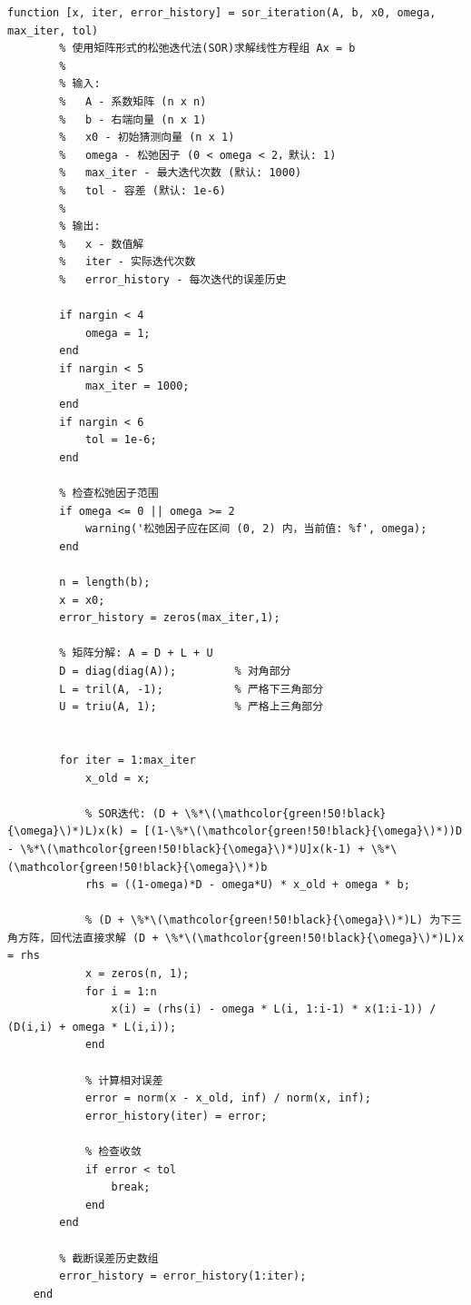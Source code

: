\begin{lstlisting}[caption={sor\_iteration.m}]
    function [x, iter, error_history] = sor_iteration(A, b, x0, omega, max_iter, tol)
        % 使用矩阵形式的松弛迭代法(SOR)求解线性方程组 Ax = b
        %
        % 输入:
        %   A - 系数矩阵 (n x n)
        %   b - 右端向量 (n x 1)
        %   x0 - 初始猜测向量 (n x 1)
        %   omega - 松弛因子 (0 < omega < 2，默认: 1)
        %   max_iter - 最大迭代次数 (默认: 1000)
        %   tol - 容差 (默认: 1e-6)
        %
        % 输出:
        %   x - 数值解
        %   iter - 实际迭代次数
        %   error_history - 每次迭代的误差历史

        if nargin < 4
            omega = 1;
        end
        if nargin < 5
            max_iter = 1000;
        end
        if nargin < 6
            tol = 1e-6;
        end

        % 检查松弛因子范围
        if omega <= 0 || omega >= 2
            warning('松弛因子应在区间 (0, 2) 内，当前值: %f', omega);
        end

        n = length(b);
        x = x0;
        error_history = zeros(max_iter,1);
        
        % 矩阵分解: A = D + L + U
        D = diag(diag(A));         % 对角部分
        L = tril(A, -1);           % 严格下三角部分
        U = triu(A, 1);            % 严格上三角部分


        for iter = 1:max_iter
            x_old = x;
            
            % SOR迭代: (D + \%*\(\mathcolor{green!50!black}{\omega}\)*)L)x(k) = [(1-\%*\(\mathcolor{green!50!black}{\omega}\)*))D - \%*\(\mathcolor{green!50!black}{\omega}\)*)U]x(k-1) + \%*\(\mathcolor{green!50!black}{\omega}\)*)b
            rhs = ((1-omega)*D - omega*U) * x_old + omega * b;
            
            % (D + \%*\(\mathcolor{green!50!black}{\omega}\)*)L) 为下三角方阵，回代法直接求解 (D + \%*\(\mathcolor{green!50!black}{\omega}\)*)L)x = rhs
            x = zeros(n, 1);
            for i = 1:n
                x(i) = (rhs(i) - omega * L(i, 1:i-1) * x(1:i-1)) / (D(i,i) + omega * L(i,i));
            end

            % 计算相对误差
            error = norm(x - x_old, inf) / norm(x, inf);
            error_history(iter) = error;
            
            % 检查收敛
            if error < tol
                break;
            end
        end

        % 截断误差历史数组
        error_history = error_history(1:iter);
    end
\end{lstlisting}

